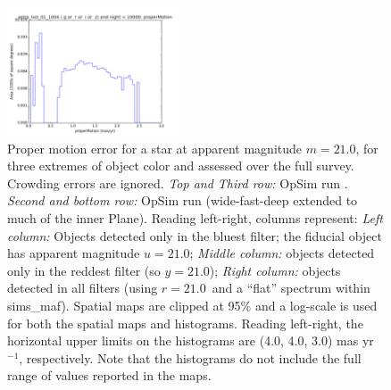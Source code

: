 \begin{figure}[ht]
\begin{center}
  \includegraphics[width=2.0in]{./figs/milkyway/astromPanels/MW_Astrom_pmError_wfdPlane_10y_hst.png}
  \end{center}
  \caption{Proper motion error for a star at apparent magnitude $m=21.0$, for three extremes of object color and assessed over the full survey. Crowding errors are ignored. {\it Top and Third row:} OpSim run . {\it Second and bottom row:} OpSim run  (wide-fast-deep extended to much of the inner Plane). Reading left-right, columns represent: {\it Left column:} Objects detected only in the bluest filter; the fiducial object has apparent magnitude $u=21.0$; {\it Middle column:} objects detected only in the reddest filter (so $y = 21.0$); {\it Right column:} objects detected in all filters (using $r=21.0$~and a ``flat'' spectrum within sims\_maf). Spatial maps are clipped at 95\% and a log-scale is used for both the spatial maps and histograms. Reading left-right, the horizontal upper limits on the histograms are (4.0, 4.0, 3.0) mas yr$^{-1}$, respectively. Note that the histograms do not include the full range of values reported in the maps.}
  \label{fig_astrom_ByFilter_pmError}
\end{figure}

